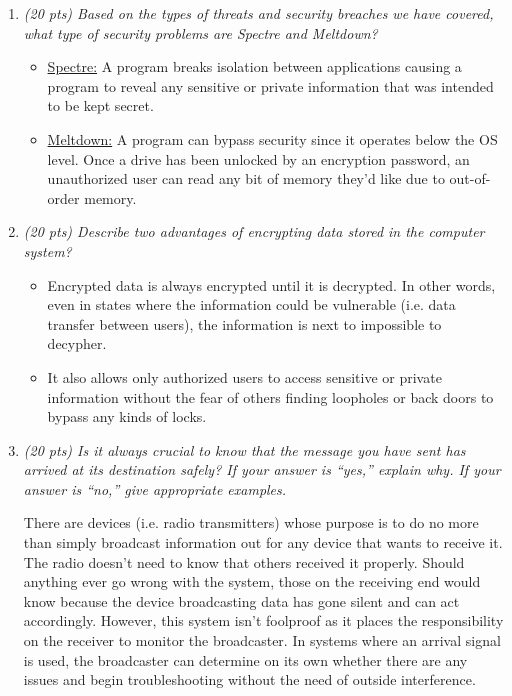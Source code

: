 \documentclass[12pt]{article}
\begin{document}
\begin{enumerate}
\begin{verbatim}
		}
		\end{verbatim}
		\color{black}
\newpage
    \item{\textit{(20 pts) Based on the types of threats and security breaches we have covered, what type of security problems are Spectre and Meltdown?}}
	    \color{blue}
	   \begin{itemize}
	   	\item \underline{Spectre:} A program breaks isolation between applications causing a program to reveal any sensitive or private information that was intended to be kept secret.
	   	\item \underline{Meltdown:} A program can bypass security since it operates below the OS level. Once a drive has been unlocked by an encryption password, an unauthorized user can read any bit of memory they'd like due to out-of-order memory.
	    \end{itemize}
	    \color{black}

    \item{\textit{(20 pts) Describe two advantages of encrypting data stored in the computer system?}}
	    \color{blue}
	   \begin{itemize}
	   	\item Encrypted data is always encrypted until it is decrypted. In other words, even in states where the information could be vulnerable (i.e. data transfer between users), the information is next to impossible to decypher.
	   	\item It also allows only authorized users to access sensitive or private information without the fear of others finding loopholes or back doors to bypass any kinds of locks.
	   \end{itemize}
	    \color{black}
    \item{\textit{(20 pts) Is it always crucial to know that the message you have sent has arrived at its destination safely? If your answer is ``yes,'' explain why. If your answer is ``no,'' give appropriate examples.}}
	    \color{blue}
	    \par There are devices (i.e. radio transmitters) whose purpose is to do no more than simply broadcast information out for any device that wants to receive it. The radio doesn't need to know that others received it properly. Should anything ever go wrong with the system, those on the receiving end would know because the device broadcasting data has gone silent and can act accordingly. However, this system isn't foolproof as it places the responsibility on the receiver to monitor the broadcaster. In systems where an arrival signal is used, the broadcaster can determine on its own whether there are any issues and begin troubleshooting without the need of outside interference.
	    \color{black}
\end{enumerate}
\end{document}
